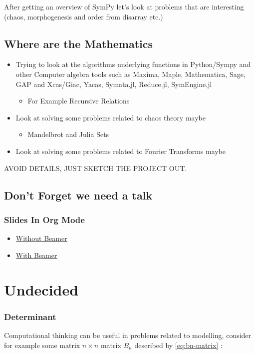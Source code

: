 \documentclass[11pt]{article}
\begin{document}
After getting an overview of SymPy let's look at problems that are interesting (chaos, morphogenesis and order from disarray etc.)

\subsection{Where are the Mathematics}
\label{sec:org6ff2eae}

\begin{itemize}
\item Trying to look at the algorithms underlying functions in Python/Sympy and other Computer algebra tools such as Maxima, Maple, Mathematica, Sage, GAP and Xcas/Giac, Yacas, Symata.jl, Reduce.jl, SymEngine.jl
\begin{itemize}
\item For Example Recursive Relations
\end{itemize}
\item Look at solving some problems related to chaos theory maybe
\begin{itemize}
\item Mandelbrot and Julia Sets
\end{itemize}
\item Look at solving some problems related to Fourier Transforms maybe
\end{itemize}


AVOID DETAILS, JUST SKETCH THE PROJECT OUT.

\subsection{Don't Forget we need a talk}
\label{sec:org7e0ff23}
\subsubsection{Slides In Org Mode}
\label{sec:org6409f9c}
\begin{itemize}
\item \href{https://orgmode.org/worg/org-tutorials/non-beamer-presentations.html}{Without Beamer}
\item \href{https://orgmode.org/worg/exporters/beamer/tutorial.html}{With Beamer}
\end{itemize}
\section{Undecided}
\label{sec:org5114791}
\subsubsection{Determinant}
\label{sec:org370fc3e}
Computational thinking can be useful in problems related to modelling, consider
for example some matrix \(n\times n\) matrix \(B_n\) described by \eqref{eq:bn-matrix} :
\end{document}
